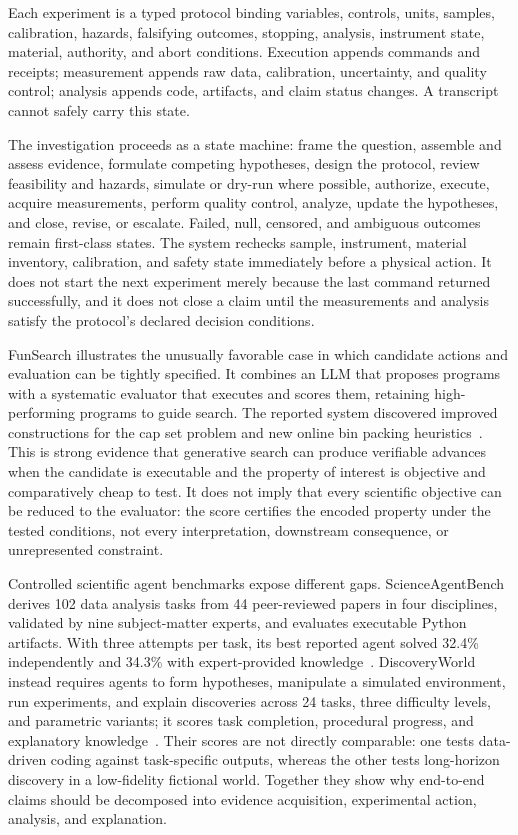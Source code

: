 Each experiment is a typed protocol binding variables, controls, units, samples, calibration, hazards, falsifying outcomes, stopping, analysis, instrument state, material, authority, and abort conditions. Execution appends commands and receipts; measurement appends raw data, calibration, uncertainty, and quality control; analysis appends code, artifacts, and claim status changes. A transcript cannot safely carry this state.

The investigation proceeds as a state machine: frame the question, assemble and assess evidence, formulate competing hypotheses, design the protocol, review feasibility and hazards, simulate or dry-run where possible, authorize, execute, acquire measurements, perform quality control, analyze, update the hypotheses, and close, revise, or escalate. Failed, null, censored, and ambiguous outcomes remain first-class states. The system rechecks sample, instrument, material inventory, calibration, and safety state immediately before a physical action. It does not start the next experiment merely because the last command returned successfully, and it does not close a claim until the measurements and analysis satisfy the protocol's declared decision conditions.

FunSearch illustrates the unusually favorable case in which candidate actions and evaluation can be tightly specified. It combines an LLM that proposes programs with a systematic evaluator that executes and scores them, retaining high-performing programs to guide search. The reported system discovered improved constructions for the cap set problem and new online bin packing heuristics~\cite{romeraparedes2024funsearch}. This is strong evidence that generative search can produce verifiable advances when the candidate is executable and the property of interest is objective and comparatively cheap to test. It does not imply that every scientific objective can be reduced to the evaluator: the score certifies the encoded property under the tested conditions, not every interpretation, downstream consequence, or unrepresented constraint.

Controlled scientific agent benchmarks expose different gaps. ScienceAgentBench derives 102 data analysis tasks from 44 peer-reviewed papers in four disciplines, validated by nine subject-matter experts, and evaluates executable Python artifacts. With three attempts per task, its best reported agent solved 32.4\% independently and 34.3\% with expert-provided knowledge~\cite{chen2025scienceagentbench}. DiscoveryWorld instead requires agents to form hypotheses, manipulate a simulated environment, run experiments, and explain discoveries across 24 tasks, three difficulty levels, and parametric variants; it scores task completion, procedural progress, and explanatory knowledge~\cite{jansen2024discoveryworld}. Their scores are not directly comparable: one tests data-driven coding against task-specific outputs, whereas the other tests long-horizon discovery in a low-fidelity fictional world. Together they show why end-to-end claims should be decomposed into evidence acquisition, experimental action, analysis, and explanation.

